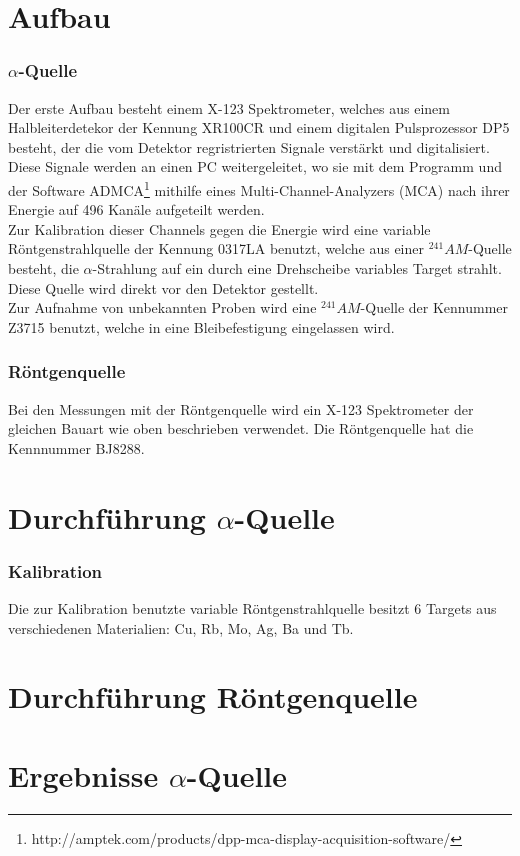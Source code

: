 \documentclass[12pt,a4paper]{article}
\begin{document}
\section{Aufbau}
\subsubsection{$\alpha$-Quelle}
Der erste Aufbau besteht einem X-123 Spektrometer, welches aus einem Halbleiterdetekor der Kennung XR100CR und einem digitalen Pulsprozessor DP5 besteht, der die vom Detektor regristrierten Signale verstärkt und digitalisiert. Diese Signale werden an einen PC weitergeleitet, wo sie mit dem Programm und der Software ADMCA\footnote{http://amptek.com/products/dpp-mca-display-acquisition-software/} mithilfe eines Multi-Channel-Analyzers (MCA) nach ihrer Energie auf 496 Kanäle aufgeteilt werden.\\
Zur Kalibration dieser Channels gegen die Energie wird eine variable Röntgenstrahlquelle der Kennung 0317LA benutzt, welche aus einer $^{241}AM$-Quelle besteht, die $\alpha$-Strahlung auf ein durch eine Drehscheibe variables Target strahlt. Diese Quelle wird direkt vor den Detektor gestellt.\\
Zur Aufnahme von unbekannten Proben wird eine $^{241}AM$-Quelle der Kennummer Z3715 benutzt, welche in eine Bleibefestigung eingelassen wird.
\subsubsection{Röntgenquelle}
Bei den Messungen mit der Röntgenquelle wird ein X-123 Spektrometer der gleichen Bauart wie oben beschrieben verwendet. Die Röntgenquelle hat die Kennnummer BJ8288.
\section{Durchführung $\alpha$-Quelle}
\subsubsection{Kalibration}
Die zur Kalibration benutzte variable Röntgenstrahlquelle besitzt 6 Targets aus verschiedenen Materialien: Cu, Rb, Mo, Ag, Ba und Tb.
\section{Durchführung Röntgenquelle}
\section{Ergebnisse $\alpha$-Quelle}
\end{document}
